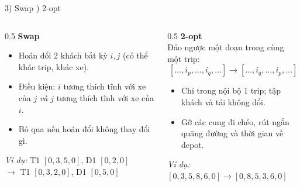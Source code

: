 \documentclass[aspectratio=169]{beamer}
\begin{document}
\begin{frame}{3) Swap ) 2-opt}
  \begin{columns}[T]
    \begin{column}{0.5\textwidth}
      \textbf{Swap}
      \begin{itemize}
        \item \small Hoán đổi 2 khách bất kỳ $i, j$ (có thể khác trip, khác xe).
        \item \small Điều kiện: $i$ tương thích tĩnh với xe của $j$ \emph{và} $j$ tương thích tĩnh với xe của $i$.
        \item \small Bỏ qua nếu hoán đổi không thay đổi gì.
      \end{itemize}
      \small\textit{Ví dụ:} T1 $[0,3,5,0]$, D1 $[0,2,0]$ \\ $\to$ T1 $[0,3,2,0]$, D1 $[0,5,0]$
    \end{column}
    \begin{column}{0.5\textwidth}
      \textbf{2-opt}\\
      \small Đảo ngược một đoạn trong cùng một trip:
      $$[\ldots,i_p,\ldots,i_q,\ldots] \to [\ldots,i_q,\ldots,i_p,\ldots]$$
      \begin{itemize}
        \item \small Chỉ trong nội bộ 1 trip; tập khách và tải không đổi.
        \item \small Gỡ các cung đi chéo, rút ngắn quãng đường và thời gian về depot.
      \end{itemize}
      \small\textit{Ví dụ:} $[0,3,5,8,6,0] \to [0,8,5,3,6,0]$
    \end{column}
  \end{columns}
\end{frame}
\end{document}
